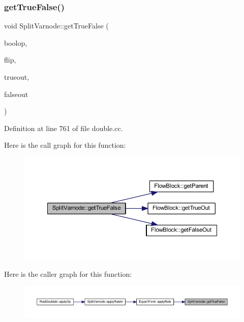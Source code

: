 \subsubsection{\texorpdfstring{getTrueFalse()}{getTrueFalse()}}
{\footnotesize\ttfamily void Split\+Varnode\+::get\+True\+False (\begin{DoxyParamCaption}\item[{\mbox{\hyperlink{class_pcode_op}{Pcode\+Op}} $\ast$}]{boolop,  }\item[{bool}]{flip,  }\item[{\mbox{\hyperlink{class_block_basic}{Block\+Basic}} $\ast$\&}]{trueout,  }\item[{\mbox{\hyperlink{class_block_basic}{Block\+Basic}} $\ast$\&}]{falseout }\end{DoxyParamCaption})\hspace{0.3cm}{\ttfamily [static]}}



Definition at line 761 of file double.\+cc.

Here is the call graph for this function\+:
\nopagebreak
\begin{figure}[H]
\begin{center}
\leavevmode
\includegraphics[width=350pt]{class_split_varnode_ad6de8bc5b9902d2870ef350aeea58c3e_cgraph}
\end{center}
\end{figure}
Here is the caller graph for this function\+:
\nopagebreak
\begin{figure}[H]
\begin{center}
\leavevmode
\includegraphics[width=350pt]{class_split_varnode_ad6de8bc5b9902d2870ef350aeea58c3e_icgraph}
\end{center}
\end{figure}
\mbox{\label{class_split_varnode_a6694bb94e5e2d4ad415b7377c3aa430f}} 
